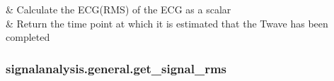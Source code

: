 \documentclass[letterpaper,10pt,english]{sphinxmanual}
\begin{document}
\begin{savenotes}\sphinxatlongtablestart\begin{longtable}[c]{}
\hline

\endfirsthead

%
{}\\
\hline

\endhead

\hline
{}\\
\endfoot

\endlastfoot

\sphinxAtStartPar
{\hyperref[\detokenize{_autosummary/signalanalysis.general.get_signal_rms:signalanalysis.general.get_signal_rms}]{}}
&
\sphinxAtStartPar
Calculate the ECG(RMS) of the ECG as a scalar
\\
\hline
\sphinxAtStartPar
{\hyperref[\detokenize{_autosummary/signalanalysis.general.get_twave_end:signalanalysis.general.get_twave_end}]{}}
&
\sphinxAtStartPar
Return the time point at which it is estimated that the T\sphinxhyphen{}wave has been completed
\\
\hline
\end{longtable}\sphinxatlongtableend\end{savenotes}


\subsubsection{signalanalysis.general.get\_signal\_rms}
\label{\detokenize{_autosummary/signalanalysis.general.get_signal_rms:signalanalysis-general-get-signal-rms}}\label{\detokenize{_autosummary/signalanalysis.general.get_signal_rms::doc}}
\end{document}
